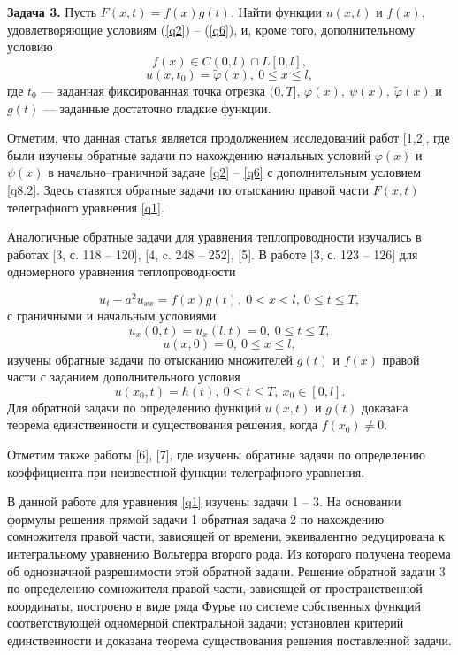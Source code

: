 \documentclass[12pt]{article}
\begin{document}
{\bf Задача 3.} Пусть $F(x,t)=f(x)g(t)$. Найти функции $u(x,t)$ и $f(x)$, удовлетворяющие условиям (\ref{q2}) -- (\ref{q6}), и, кроме того, дополнительному условию
\begin{equation}\label{q8.2.0}f(x)\in C(0,l)\cap L[0,l],\end{equation}
\begin{equation}\label{q8.2}u(x,t_0)=\widetilde{\varphi}(x),\ 0\leqslant x\leqslant l,\end{equation}
где $t_0$ --- заданная фиксированная точка отрезка $(0,T]$, $\varphi(x),\ \psi(x),\ \widetilde{\varphi}(x)$ и $g(t)$ --- заданные достаточно гладкие функции.

Отметим, что данная статья является продолжением исследований работ [1,2], где были изучены обратные задачи по нахождению начальных условий $\varphi(x)$ и $\psi(x)$ в начально--граничной задаче \eqref{q2} -- \eqref{q6} с дополнительным условием \eqref{q8.2}. Здесь ставятся обратные задачи по отысканию правой части $F(x,t)$ телеграфного уравнения \eqref{q1}.

Аналогичные обратные задачи для уравнения теплопроводности изучались в работах [3, с. 118 -- 120], [4, c. 248 -- 252], [5]. В работе [3, с. 123 -- 126] для одномерного уравнения теплопроводности

$$u_t-a^2u_{xx}=f(x)g(t),\ 0<x<l,\ 0\leqslant t\leqslant T,$$
с граничными и начальным условиями
$$u_x(0,t)=u_x(l,t)=0,\ 0\leqslant t\leqslant T,$$
$$u(x,0)=0,\ 0\leqslant x\leqslant l,$$
изучены обратные задачи по отысканию множителей $g(t)$ и $f(x)$ правой части с заданием дополнительного условия
\begin{equation}\label{aa1}u(x_0,t)=h(t),\ 0\leqslant t\leqslant T,\ x_0\in[0,l].\end{equation}
Для обратной задачи по определению функций $u(x,t)$ и $g(t)$ доказана теорема единственности и существования решения, когда $f(x_0)\not=0$.

Отметим также работы [6], [7], где изучены обратные задачи по определению коэффициента при неизвестной функции телеграфного уравнения.

В данной работе для уравнения \eqref{q1} изучены задачи 1 -- 3. На основании формулы решения прямой задачи 1 обратная задача 2 по нахождению сомножителя правой части, зависящей от
времени, эквивалентно редуцирована к интегральному уравнению Вольтерра второго рода. Из которого получена
теорема об однозначной разрешимости этой обратной задачи. Решение обратной задачи 3 по
определению сомножителя правой части, зависящей от пространственной координаты,
построено в виде ряда Фурье по системе собственных функций соответствующей одномерной спектральной задачи; установлен критерий единственности и доказана теорема существования решения поставленной задачи.
\end{document}
